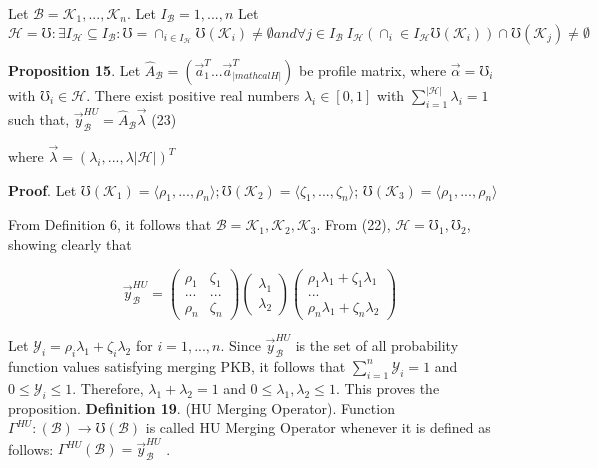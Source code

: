 \documentclass[]{iosart2c}
\begin{document}
Let  $\mathcal{B} = {\mathcal{K}_1, ...,\mathcal{K}_n}$. Let $I_\mathcal{B} = {1, ..., n} $
Let $\mathcal{H} = { \mho : \exists I_\mathcal{H} \subseteq I_\mathcal{B} : \mho = \cap_{i \in I_\mathcal{H}} \mho(\mathcal{K}_i) \neq \emptyset and \forall j \in I_\mathcal{B} \ I_\mathcal{H}(\cap_i\in I_\mathcal{H} \mho(\mathcal{K}_i)) \cap \mho(\mathcal{K}_j) \neq \emptyset }$

\textbf{Proposition 15}. Let $\hat{A}_\mathcal{B} = (\vec{a}^T_1 ...\vec{a}^T_|mathcal{H}|)$ be profile
matrix, where $\vec{\alpha} = \mho_i$ with $\mho_i \in \mathcal{H}$. There exist positive
real numbers $\lambda_i \in [0, 1]$ with $\sum^{|\mathcal{H}|}_{i=1} \lambda_i = 1$ such
that,
$\vec{y}^{HU}_\mathcal{B} = \hat{A}_\mathcal{B}\vec{\lambda}$ (23)

where $\vec{\lambda} = (\lambda_i, ..., \lambda|\mathcal{H}|)^T$

\textbf{Proof}. Let $\mho(\mathcal{K}_1)=\langle \rho_1, ..., \rho_n \rangle;\mho(\mathcal{K}_2)=\langle\zeta_1, ..., \zeta_n \rangle$;
$\mho(\mathcal{K}_3) = \langle\rho_1, ..., \rho_n\rangle$
 
From Definition 6, it follows that $\mathcal{B} = {\mathcal{K}_1,
\mathcal{K}_2,\mathcal{K}_3}$. From (22), $\mathcal{H} = {\mho_1,\mho_2}$, showing clearly
that

$$
\vec{y}^{HU}_\mathcal{B} =
\left( \begin{array}{cc}
\rho_1 &\zeta_1 \\
... &... \\
\rho_n &\zeta_n
\end{array} \right)
%
\left( \begin{array}{cc}
\lambda_1\\
\lambda_2
\end{array}
\right)
\left( \begin{array}{cc}
\rho_1\lambda_1 + \zeta_1\lambda_1\\
...\\
\rho_n\lambda_1 + \zeta_n\lambda_2
\end{array} \right)
$$

Let $\mathcal{Y}_i = \rho_i\lambda_1 + \zeta_i\lambda_2$ for $i = 1, ... , n$. Since $\vec{y}^{HU}_\mathcal{B}$
 is the set of all probability function values satisfying
merging PKB, it follows that $\sum^n_{i=1} \mathcal{Y}_i = 1$ and $0 \le 
\mathcal{Y}_i \le 1$. Therefore, $\lambda_1 + \lambda_2 = 1$ and $0 \le \lambda_1, \lambda_2 \le 1$.
 This proves the proposition.
\textbf{Definition 19}. (HU Merging Operator). Function
$\Gamma^{HU} : (\mathcal{B}) \to \mho(\mathcal{B})$ is called HU Merging Operator
whenever it is defined as follows: $\Gamma^{HU}(\mathcal{B}) = \vec{y}^{HU}_\mathcal{B}$ .
\end{document}
